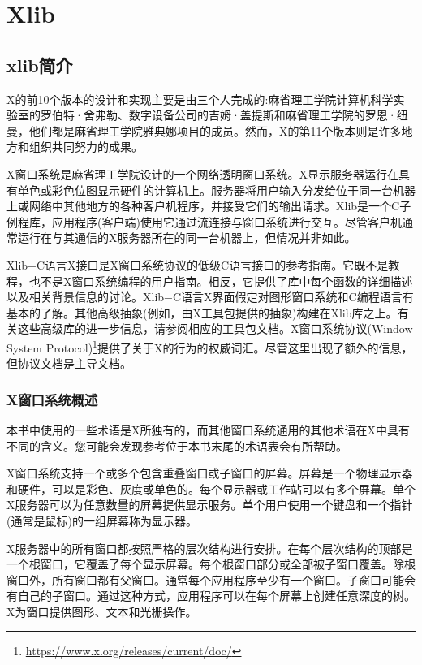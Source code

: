 \chapter{Xlib}


\section{xlib简介}

X的前10个版本的设计和实现主要是由三个人完成的:麻省理工学院计算机科学实验室的罗伯特·舍弗勒、数字设备公司的吉姆·盖提斯和麻省理工学院的罗恩·纽曼，他们都是麻省理工学院雅典娜项目的成员。然而，X的第11个版本则是许多地方和组织共同努力的成果。

X窗口系统是麻省理工学院设计的一个网络透明窗口系统。X显示服务器运行在具有单色或彩色位图显示硬件的计算机上。服务器将用户输入分发给位于同一台机器上或网络中其他地方的各种客户机程序，并接受它们的输出请求。Xlib是一个C子例程库，应用程序(客户端)使用它通过流连接与窗口系统进行交互。尽管客户机通常运行在与其通信的X服务器所在的同一台机器上，但情况并非如此。

Xlib−C语言X接口是X窗口系统协议的低级C语言接口的参考指南。它既不是教程，也不是X窗口系统编程的用户指南。相反，它提供了库中每个函数的详细描述以及相关背景信息的讨论。Xlib−C语言X界面假定对图形窗口系统和C编程语言有基本的了解。其他高级抽象(例如，由X工具包提供的抽象)构建在Xlib库之上。有关这些高级库的进一步信息，请参阅相应的工具包文档。X窗口系统协议(Window System Protocol)\footnote{\url{https://www.x.org/releases/current/doc/}}提供了关于X的行为的权威词汇。尽管这里出现了额外的信息，但协议文档是主导文档。

\subsection{X窗口系统概述}

本书中使用的一些术语是X所独有的，而其他窗口系统通用的其他术语在X中具有不同的含义。您可能会发现参考位于本书末尾的术语表会有所帮助。

X窗口系统支持一个或多个包含重叠窗口或子窗口的屏幕。屏幕是一个物理显示器和硬件，可以是彩色、灰度或单色的。每个显示器或工作站可以有多个屏幕。单个X服务器可以为任意数量的屏幕提供显示服务。单个用户使用一个键盘和一个指针(通常是鼠标)的一组屏幕称为显示器。

X服务器中的所有窗口都按照严格的层次结构进行安排。在每个层次结构的顶部是一个根窗口，它覆盖了每个显示屏幕。每个根窗口部分或全部被子窗口覆盖。除根窗口外，所有窗口都有父窗口。通常每个应用程序至少有一个窗口。子窗口可能会有自己的子窗口。通过这种方式，应用程序可以在每个屏幕上创建任意深度的树。X为窗口提供图形、文本和光栅操作。

